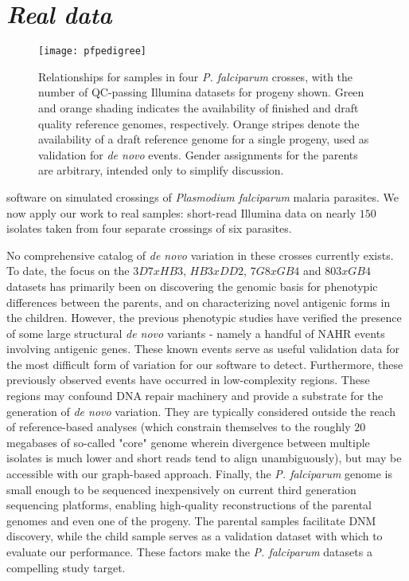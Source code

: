 \chapter{\textit{Real data}}
\label{ch:realdata}

\begin{figure}[h!]
  \centering
    \texttt{[image: pfpedigree]}
  \caption{Relationships for samples in four \textit{P. falciparum} crosses, with the number of QC-passing Illumina datasets for progeny shown.  Green and orange shading indicates the availability of finished and draft quality reference genomes, respectively.  Orange stripes denote the availability of a draft reference genome for a single progeny, used as validation for \textit{de novo} events.  Gender assignments for the parents are arbitrary, intended only to simplify discussion.}
  \label{fig:pfpedigree}
\end{figure}

 software on simulated crossings of \textit{Plasmodium falciparum} malaria parasites.  We now apply our work to real samples: short-read Illumina data on nearly $150$ isolates taken from four separate crossings of six parasites.

No comprehensive catalog of \textit{de novo} variation in these crosses currently exists.  To date, the focus on the $3D7xHB3$, $HB3xDD2$, $7G8xGB4$ and $803xGB4$ datasets has primarily been on discovering the genomic basis for phenotypic differences between the parents, and on characterizing novel antigenic forms in the children.  However, the previous phenotypic studies have verified the presence of some large structural \textit{de novo} variants - namely a handful of NAHR events involving antigenic genes.  These known events serve as useful validation data for the most difficult form of variation for our software to detect.  Furthermore, these previously observed events have occurred in low-complexity regions.  These regions may confound DNA repair machinery and provide a substrate for the generation of \textit{de novo} variation.  They are typically considered outside the reach of reference-based analyses (which constrain themselves to the roughly $20$ megabases of so-called "core" genome wherein divergence between multiple isolates is much lower and short reads tend to align unambiguously\cite{Miles:2015in}), but may be accessible with our graph-based approach.  Finally, the \textit{P. falciparum} genome is small enough to be sequenced inexpensively on current third generation sequencing platforms, enabling high-quality reconstructions of the parental genomes and even one of the progeny.  The parental samples facilitate DNM discovery, while the child sample serves as a validation dataset with which to evaluate our performance.  These factors make the \textit{P. falciparum} datasets a compelling study target.

